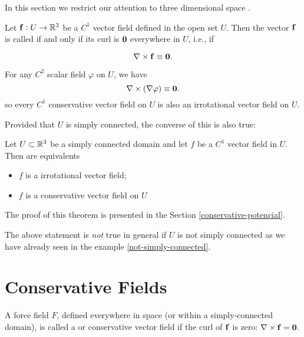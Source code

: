 In this section we restrict our attention to  three dimensional space .

\begin{df}

Let  \(\mathbf{ f}: U \to \mathbb{R}^3\) be a \(C^1\)
vector field defined in the open set  \(U\).
Then the vector \(\mathbf{ f}\) is called
 if and only if its curl
is \(\mathbf{ 0}\) everywhere in \(U\), i.e., if

\[\nabla \times \mathbf{ f} \equiv \mathbf{ 0}.\]
 
\end{df}

For any \(C^2\) scalar field \(\varphi\) on \(U\),
we have
\[\nabla \times (\nabla \varphi) \equiv \mathbf{ 0}.\]
so every \(C^1\) conservative vector field on \(U\) is also an
irrotational vector field on \(U\).


Provided that \(U\) is simply connected, the
converse of this is also true: 

\begin{thm} Let \(U \subset \mathbb{R}^3\) be a simply connected domain and let $f$ be a $C^1$ vector field in $U$. 
Then are equivalents 
\begin{itemize}
 \item $f$ is a irrotational vector field;
 \item $f$ is a conservative vector field on \(U\)
\end{itemize}



\end{thm}

The proof of this theorem is presented in the Section \ref{conservative-potencial}.

The above statement is \emph{not} true in general if \(U\) is not simply
connected as we have already seen in the example \ref{not-simply-connected}.



  
  
\section{Conservative Fields}





\begin{df}
 A force field $F$, defined everywhere
in space (or within a simply-connected domain), is called
a  or
conservative vector field if the curl of $\mathbf{ f}$ is zero: $\nabla \times \mathbf{ f} = \mathbf{ 0}.$
\end{df}




